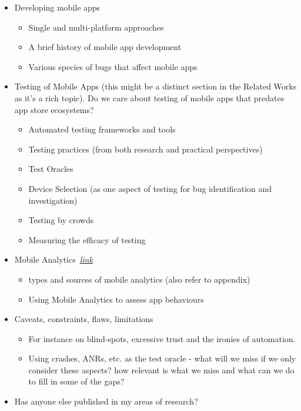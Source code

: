 \begin{itemize}
\begin{itemize}
    \end{itemize}
    \item Developing mobile apps
    \begin{itemize}
        \item Single and multi-platform approaches
        \item A brief history of mobile app development
        \item Various species of bugs that affect mobile apps
    \end{itemize}
    \item Testing of Mobile Apps (this might be a distinct section in the Related Works as it's a rich topic). Do we care about testing of mobile apps that predates app store ecosystems?
    \begin{itemize}
        \item Automated testing frameworks and tools
        \item Testing practices (from both research and practical perspectives)
        \item Test Oracles
        \item Device Selection (as one aspect of testing for bug identification and investigation)
        \item Testing by crowds
        \item Measuring the efficacy of testing
    \end{itemize}
    \item Mobile Analytics~\hyperlink{mobile.analytics}{\emph{link}}
    \begin{itemize}
        \item types and sources of mobile analytics (also refer to appendix)
        \item Using Mobile Analytics to assess app behaviours
    \end{itemize}
    \item Caveats, constraints, flaws, limitations
    \begin{itemize}
        \item For instance on blind-spots, excessive trust and the ironies of automation. 
        \item Using crashes, ANRs, etc. as the test oracle - what will we miss if we only consider these aspects? how relevant is what we miss and what can we do to fill in some of the gaps?
    \end{itemize}
    \item Has anyone else published in my areas of research?
\end{itemize}

